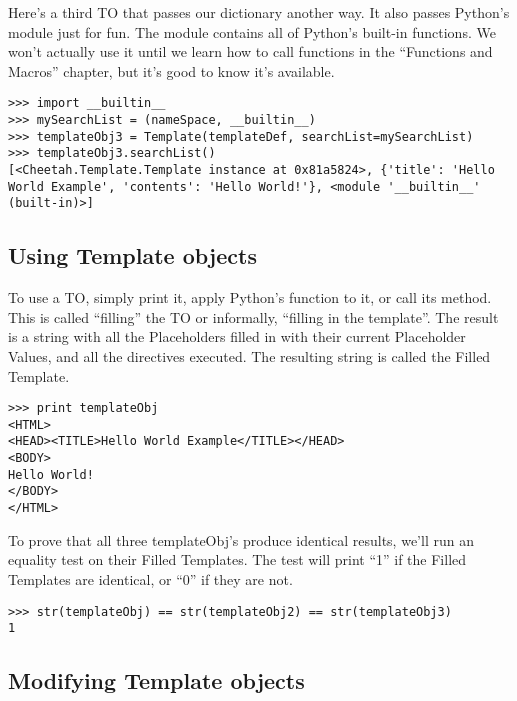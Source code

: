 Here's a third TO that passes our  dictionary
another way.  It also passes Python's  module just for
fun.  The  module contains all of Python's built-in
functions.  We won't actually use it until we learn how to call functions in
the ``Functions and Macros'' chapter, but it's good to know it's available.

\begin{verbatim}
>>> import __builtin__
>>> mySearchList = (nameSpace, __builtin__)
>>> templateObj3 = Template(templateDef, searchList=mySearchList)
>>> templateObj3.searchList()
[<Cheetah.Template.Template instance at 0x81a5824>, {'title': 'Hello World Example', 'contents': 'Hello World!'}, <module '__builtin__' (built-in)>]
\end{verbatim}



\subsection{Using Template objects}

To use a TO, simply print it, apply Python's
 function to it, or call its  method.  This is
called ``filling'' the TO or informally,  ``filling in the template''.  The
result is a string with all the Placeholders filled in with their current
Placeholder Values, and all the directives executed.  The resulting string is
called the Filled Template.

\begin{verbatim}
>>> print templateObj
<HTML>
<HEAD><TITLE>Hello World Example</TITLE></HEAD>
<BODY>
Hello World!
</BODY>
</HTML>
\end{verbatim}

To prove that all three templateObj's produce identical results, we'll run an
equality test on their Filled Templates.  The test will print ``1'' if the
Filled Templates are identical, or ``0'' if they are not.

\begin{verbatim}
>>> str(templateObj) == str(templateObj2) == str(templateObj3)
1
\end{verbatim}


\subsection{Modifying Template objects}

